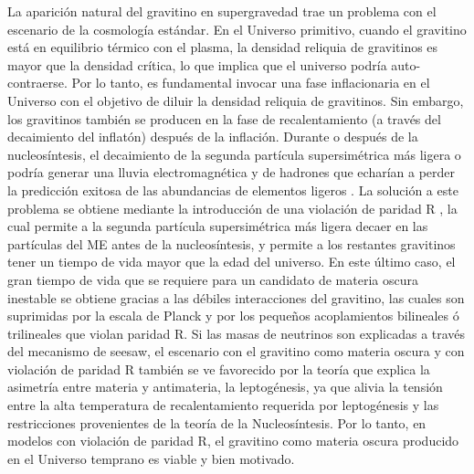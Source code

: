 La aparición natural del gravitino en supergravedad trae un problema
con el escenario de la cosmología estándar. En el Universo primitivo,
cuando el gravitino está en equilibrio térmico con el plasma, la
densidad reliquia de gravitinos es mayor que la densidad crítica, lo
que implica que el universo podría auto-contraerse. Por lo tanto, es
fundamental invocar una fase inflacionaria en el Universo con el
objetivo de diluir la densidad reliquia de gravitinos. Sin embargo,
los gravitinos también se producen en la fase de recalentamiento (a
través del decaimiento del inflatón) después de la inflación. Durante
o después de la nucleosíntesis, el decaimiento de la segunda partícula
supersimétrica más ligera o  podría
generar una lluvia electromagnética y de hadrones que echarían a
perder la predicción exitosa de las abundancias de elementos ligeros
\cite{Sarkar:1995dd}. La solución a este problema se obtiene mediante
la introducción de una violación de paridad R
\cite{Buchmuller:2007ui}, la cual permite a la segunda partícula
supersimétrica más ligera decaer en las partículas del ME
antes de la nucleosíntesis, y permite a los restantes gravitinos tener
un tiempo de vida mayor que la edad del universo. En este último caso,
el gran tiempo de vida que se requiere para un candidato de materia
oscura inestable se obtiene gracias a las débiles interacciones del
gravitino, las cuales son suprimidas por la escala de Planck y por los
pequeños acoplamientos bilineales ó trilineales que violan paridad
R. Si las masas de neutrinos son explicadas a través del mecanismo de
seesaw, el escenario con el gravitino como materia oscura y con
violación de paridad R también se ve favorecido por la teoría que
explica la asimetría entre materia y antimateria, la leptogénesis, ya
que alivia la tensión entre la alta temperatura de recalentamiento
requerida por leptogénesis y las restricciones provenientes de la
teoría de la Nucleosíntesis.  Por lo tanto, en modelos con violación de
paridad R, el gravitino como materia oscura producido en el Universo
temprano es viable y bien motivado.

